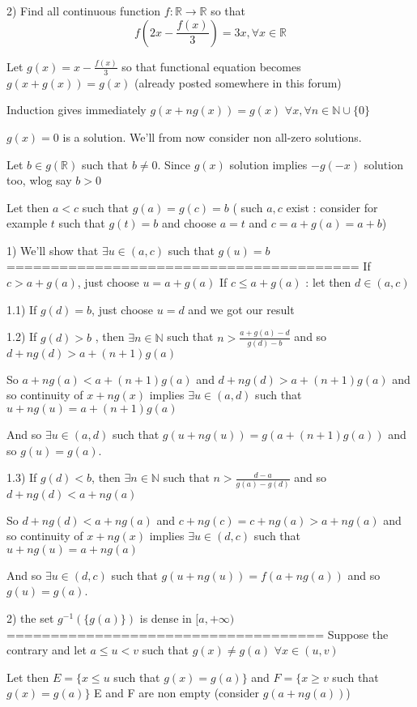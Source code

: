 \begin{solution}
	\begin{tcolorbox}2) Find all continuous function $f:\mathbb{R}\to\mathbb{R}$ so that \[f(2x-\frac{f(x)}{3})=3x,\forall x\in\mathbb{R}\]\end{tcolorbox}
Let $g(x)=x-\frac{f(x)}3$ so that functional equation becomes $g(x+g(x))=g(x)$ (already posted somewhere in this forum)

Induction gives immediately $g(x+ng(x))=g(x)$ $\forall x,\forall n\in \mathbb N\cup\{0\}$

$g(x)=0$ is a solution.
We'll from now consider non all-zero solutions.

Let $b\in g(\mathbb R)$ such that $b\ne 0$. Since $g(x)$ solution implies $-g(-x)$ solution too, wlog say $b>0$

Let then $a<c$ such that $g(a)=g(c)=b$ ( such $a,c$ exist : consider for example $t$ such that $g(t)=b$ and choose $a=t$ and $c=a+g(a)=a+b$)

1) We'll show that $\exists u\in(a,c)$ such that $g(u)=b$
========================================
If $c>a+g(a)$, just choose $u=a+g(a)$
If $c\le a+g(a)$ : let then $d\in (a,c)$

1.1) If $g(d)=b$, just choose $u=d$ and we got our result

1.2) If $g(d)>b$ , then $\exists n\in\mathbb N$ such that $n>\frac{a+g(a)-d}{g(d)-b}$ and so $d+ng(d)>a+(n+1)g(a)$

So $a+ng(a)<a+(n+1)g(a)$ and $d+ng(d)>a+(n+1)g(a)$ and so continuity of $x+ng(x)$ implies $\exists u\in(a,d)$ such that $u+ng(u)=a+(n+1)g(a)$

And so $\exists u\in(a,d)$ such that $g(u+ng(u))=g(a+(n+1)g(a))$ and so $g(u)=g(a)$.

1.3) If $g(d)<b$, then $\exists n\in\mathbb N$ such that $n>\frac{d-a}{g(a)-g(d)}$ and so $d+ng(d)< a+ng(a)$

So $d+ng(d)< a+ng(a)$ and $c+ng(c)=c+ng(a)>a+ng(a)$ and so continuity of $x+ng(x)$ implies $\exists u\in(d,c)$ such that $u+ng(u)=a+ng(a)$

And so $\exists u\in (d,c)$ such that $g(u+ng(u))=f(a+ng(a))$ and so $g(u)=g(a)$.

2) the set $g^{-1}(\{g(a)\})$ is dense in $[a,+\infty)$
====================================
Suppose the contrary and let $a\le u<v$ such that $g(x)\ne g(a)$ $\forall x\in (u,v)$

Let then $E=\{x\le u$ such that $g(x)=g(a)\}$ and $F=\{x\ge v$ such that $g(x)=g(a)\}$
E and F are non empty (consider $g(a+ng(a))$)


\end{solution}
